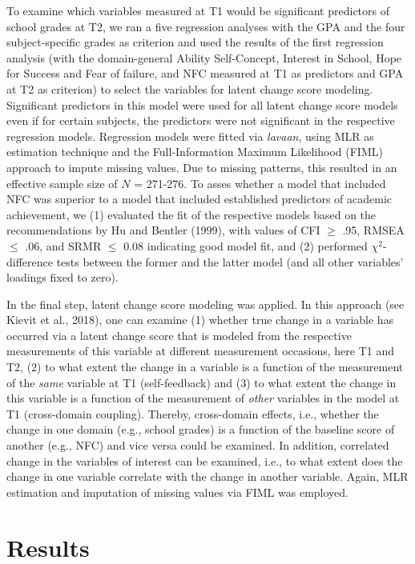 \documentclass[
  man]{apa6}
\begin{document}
To examine which variables measured at T1 would be significant predictors of school grades at T2, we ran a five regression analyses with the GPA and the four subject-specific grades as criterion and used the results of the first regression analysis (with the domain-general Ability Self-Concept, Interest in School, Hope for Success and Fear of failure, and NFC measured at T1 as predictors and GPA at T2 as criterion) to select the variables for latent change score modeling. Significant predictors in this model were used for all latent change score models even if for certain subjects, the predictors were not significant in the respective regression models. Regression models were fitted via \emph{lavaan}, using MLR as estimation technique and the Full-Information Maximum Likelihood (FIML) approach to impute missing values. Due to missing patterns, this resulted in an effective sample size of \(N\) = 271-276. To asses whether a model that included NFC was superior to a model that included established predictors of academic achievement, we (1) evaluated the fit of the respective models based on the recommendations by Hu and Bentler (1999), with values of CFI \(\ge\) .95, RMSEA \(\le\) .06, and SRMR \(\le\) 0.08 indicating good model fit, and (2) performed \(\chi^2\)-difference tests between the former and the latter model (and all other variables' loadings fixed to zero).

In the final step, latent change score modeling was applied. In this approach (see Kievit et al., 2018), one can examine (1) whether true change in a variable has occurred via a latent change score that is modeled from the respective measurements of this variable at different measurement occasions, here T1 and T2, (2) to what extent the change in a variable is a function of the measurement of the \emph{same} variable at T1 (self-feedback) and (3) to what extent the change in this variable is a function of the measurement of \emph{other} variables in the model at T1 (cross-domain coupling). Thereby, cross-domain effects, i.e., whether the change in one domain (e.g., school grades) is a function of the baseline score of another (e.g., NFC) and vice versa could be examined. In addition, correlated change in the variables of interest can be examined, i.e., to what extent does the change in one variable correlate with the change in another variable. Again, MLR estimation and imputation of missing values via FIML was employed.

\hypertarget{results}{%
\section{Results}\label{results}}
\end{document}
